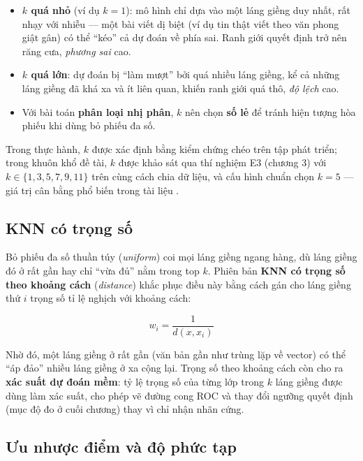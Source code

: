 \begin{itemize}
    \item \textbf{$k$ quá nhỏ} (ví dụ $k = 1$): mô hình chỉ dựa vào một láng giềng duy nhất, rất nhạy với nhiễu --- một bài viết dị biệt (ví dụ tin thật viết theo văn phong giật gân) có thể ``kéo'' cả dự đoán về phía sai. Ranh giới quyết định trở nên răng cưa, \textit{phương sai} cao.
    \item \textbf{$k$ quá lớn}: dự đoán bị ``làm mượt'' bởi quá nhiều láng giềng, kể cả những láng giềng đã khá xa và ít liên quan, khiến ranh giới quá thô, \textit{độ lệch} cao.
    \item Với bài toán \textbf{phân loại nhị phân}, $k$ nên chọn \textbf{số lẻ} để tránh hiện tượng hòa phiếu khi dùng bỏ phiếu đa số.
\end{itemize}

Trong thực hành, $k$ được xác định bằng kiểm chứng chéo trên tập phát triển; trong khuôn khổ đề tài, $k$ được khảo sát qua thí nghiệm E3 (chương 3) với $k \in \{1, 3, 5, 7, 9, 11\}$ trên cùng cách chia dữ liệu, và cấu hình chuẩn chọn $k = 5$ --- giá trị cân bằng phổ biến trong tài liệu \cite{sklearn}.

\subsection{KNN có trọng số}
\label{sec:knn-trong-so}

Bỏ phiếu đa số thuần túy (\textit{uniform}) coi mọi láng giềng ngang hàng, dù láng giềng đó ở rất gần hay chỉ ``vừa đủ'' nằm trong top $k$. Phiên bản \textbf{KNN có trọng số theo khoảng cách} (\textit{distance}) khắc phục điều này bằng cách gán cho láng giềng thứ $i$ trọng số tỉ lệ nghịch với khoảng cách:

\begin{equation}
    w_i = \frac{1}{d(x, x_i)}
    \label{eq:distance-weight}
\end{equation}

Nhờ đó, một láng giềng ở rất gần (văn bản gần như trùng lặp về vector) có thể ``áp đảo'' nhiều láng giềng ở xa cộng lại. Trọng số theo khoảng cách còn cho ra \textbf{xác suất dự đoán mềm}: tỷ lệ trọng số của từng lớp trong $k$ láng giềng được dùng làm xác suất, cho phép vẽ đường cong ROC và thay đổi ngưỡng quyết định (mục độ đo ở cuối chương) thay vì chỉ nhận nhãn cứng.

\subsection{Ưu nhược điểm và độ phức tạp}

